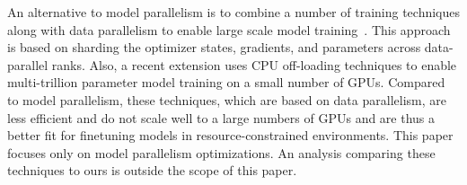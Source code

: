 \documentclass{article}
\begin{document}
An alternative to model parallelism is to combine a number of training techniques along with data parallelism to enable large scale model training~\cite{zero, zero-offload, zero-infinity, deepspeed}. This approach is based on sharding the optimizer states, gradients, and parameters across data-parallel ranks. Also, a recent extension \cite{zero-infinity} uses CPU off-loading techniques to enable multi-trillion parameter model training on a small number of GPUs. Compared to model parallelism, these techniques, which are based on data parallelism, are less efficient and do not scale well to a large numbers of GPUs \cite{megatron-pipeline} and are thus a better fit for finetuning models in resource-constrained environments. This paper focuses only on model parallelism optimizations. An analysis comparing these techniques to ours is outside the scope of this paper.

\end{document}
